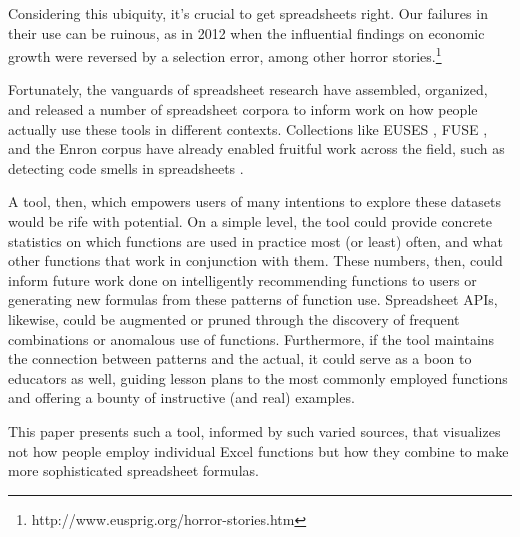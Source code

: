 \documentclass[conference]{IEEEtran}
\begin{document}
Considering this ubiquity, it's crucial to get spreadsheets right. Our failures in their use can be ruinous, as in 2012 when the influential findings on economic growth were reversed by a selection error, among other horror stories.\footnote{http://www.eusprig.org/horror-stories.htm}

Fortunately, the vanguards of spreadsheet research have assembled, organized, and released a number of spreadsheet corpora to inform work on how people actually use these tools in different contexts. Collections like EUSES \cite{fisher2005euses}, FUSE \cite{barik2015fuse}, and the Enron corpus \cite{hermans2015enron} have already enabled fruitful work across the field, such as detecting code smells in spreadsheets \cite{hermans2012detecting} \cite{cunha2012smellsheet}.  \par

A tool, then, which empowers users of many intentions to explore these datasets would be rife with potential. On a simple level, the tool could provide concrete statistics on which functions are used in practice most (or least) often, and what other functions that work in conjunction with them. These numbers, then, could inform future work done on intelligently recommending functions to users or generating new formulas from these patterns of function use. Spreadsheet APIs, likewise, could be augmented or pruned through the discovery of frequent combinations or anomalous use of functions. Furthermore, if the tool maintains the connection between patterns and the actual, it could serve as a boon to educators as well, guiding lesson plans to the most commonly employed functions and offering a bounty of instructive (and real) examples.\par
This paper presents such a tool, informed by such varied sources, that visualizes not how people employ individual Excel functions but how they combine to make more sophisticated spreadsheet formulas. 
\end{document}
